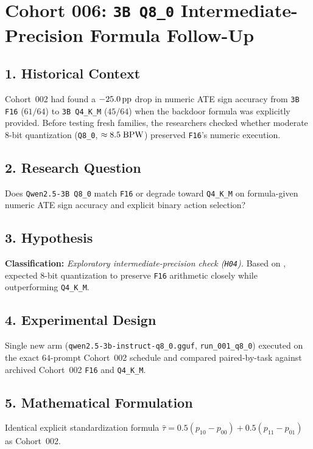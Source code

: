 \section{Cohort 006: \texttt{3B Q8\_0} Intermediate-Precision Formula Follow-Up}

\subsection*{1. Historical Context}
Cohort~002 had found a $-25.0\,\mathrm{pp}$ drop in numeric ATE sign accuracy from \texttt{3B F16} ($61/64$) to \texttt{3B Q4\_K\_M} ($45/64$) when the backdoor formula was explicitly provided. Before testing fresh families, the researchers checked whether moderate 8-bit quantization (\texttt{Q8\_0}, $\approx 8.5\;\mathrm{BPW}$) preserved \texttt{F16}'s numeric execution.

\subsection*{2. Research Question}
Does \texttt{Qwen2.5-3B Q8\_0} match \texttt{F16} or degrade toward \texttt{Q4\_K\_M} on formula-given numeric ATE sign accuracy and explicit binary action selection?

\subsection*{3. Hypothesis}
\textbf{Classification:} \emph{Exploratory intermediate-precision check (\texttt{H04}).} Based on \citet{liu2025hurts}, expected 8-bit quantization to preserve \texttt{F16} arithmetic closely while outperforming \texttt{Q4\_K\_M}.

\subsection*{4. Experimental Design}
Single new arm (\texttt{qwen2.5-3b-instruct-q8\_0.gguf}, \texttt{run\_001\_q8\_0}) executed on the exact $64$-prompt Cohort~002 schedule and compared paired-by-task against archived Cohort~002 \texttt{F16} and \texttt{Q4\_K\_M}.

\subsection*{5. Mathematical Formulation}
Identical explicit standardization formula $\hat{\tau} = 0.5(p_{10}-p_{00}) + 0.5(p_{11}-p_{01})$ as Cohort~002.

